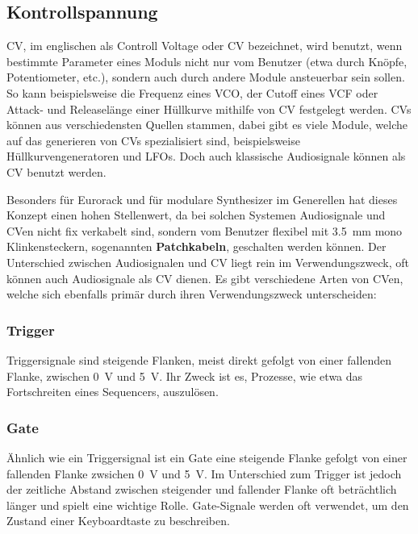 \newpage

\subsection{Kontrollspannung \label{CV}}
\label{sec:orgeca8b12}
\acl{CV}, im englischen als Controll Voltage oder \acs{CV} bezeichnet, wird benutzt, wenn bestimmte Parameter eines Moduls nicht nur vom Benutzer (etwa durch Knöpfe, Potentiometer, etc.), sondern auch durch andere Module ansteuerbar sein sollen. So kann beispielsweise die Frequenz eines \acs{VCO}, der Cutoff eines \ac{VCF} oder Attack- und Releaselänge einer Hüllkurve mithilfe von \acl{CV} festgelegt werden. \aclp{CV} können aus verschiedensten Quellen stammen, dabei gibt es viele Module, welche auf das generieren von \aclp{CV} spezialisiert sind, beispielsweise Hüllkurvengeneratoren und \acp{LFO}. Doch auch klassische Audiosignale können als \acl{CV} benutzt werden.

Besonders für Eurorack und für modulare Synthesizer im Generellen hat dieses Konzept einen hohen Stellenwert, da bei solchen Systemen Audiosignale und \acl{CV}en nicht fix verkabelt sind, sondern vom Benutzer flexibel mit \SI{3.5}{\milli\meter} mono Klinkensteckern, sogenannten \textbf{Patchkabeln}, geschalten werden können. Der Unterschied zwischen Audiosignalen und \acl{CV} liegt rein im Verwendungszweck, oft können auch Audiosignale als \acl{CV} dienen. Es gibt verschiedene Arten von \acl{CV}en, welche sich ebenfalls primär durch ihren Verwendungszweck unterscheiden:

\subsubsection{Trigger}
\label{sec:orga14953b}
Triggersignale sind steigende Flanken, meist direkt gefolgt von einer fallenden Flanke, zwischen \SI{0}{\volt} und \SI{5}{\volt}. Ihr Zweck ist es, Prozesse, wie etwa das Fortschreiten eines Sequencers, auszulösen.

\newpage

\subsubsection{Gate}
\label{sec:org896656b}
Ähnlich wie ein Triggersignal ist ein Gate eine steigende Flanke gefolgt von einer fallenden Flanke zwsichen \SI{0}{\volt} und \SI{5}{\volt}. Im Unterschied zum Trigger ist jedoch der zeitliche Abstand zwischen steigender und fallender Flanke oft beträchtlich länger und spielt eine wichtige Rolle. Gate-Signale werden oft verwendet, um den Zustand einer Keyboardtaste zu beschreiben.

